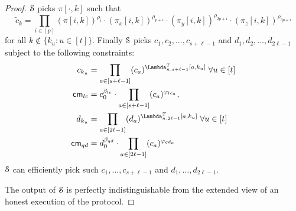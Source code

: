 \begin{proof}
	$\mathcal{S}$ picks $\pi[\cdot,k]$ such that 
	\[\tilde{c}_k = \prod_{i\in[p]}(\pi[i,k])^{\rho_i}\cdot (\pi_x[i,k])^{\rho_{p+i}}\cdot(\pi_y[i,k])^{\rho_{2p+i}}\cdot(\pi_z[i,k])^{\rho_{3p+i}}\] for all $k\notin\{k_u:u\in[t]\}$.
	Finally $\mathcal{S}$ picks $c_1,c_2,\ldots, c_{s+\ell-1}$ and $d_1, d_2, \ldots, d_{2\ell-1}$ subject to the following constraints:
	\begin{align*}
	c_{k_u} &= \prod_{a\in[s+\ell-1]} (c_a)^{\Lambda_{n,s+\ell-1}^T[a,k_u]} \; \forall u\in[t]\\  
	\cm_{lc} &= c_0^{\beta_{lc}}\cdot\prod_{a\in[s+\ell-1]}(c_a)^{\varphi_{lc_a}}, \\
	d_{k_u} &= \prod_{a\in[2\ell-1]} (d_a)^{\Lambda_{n,2\ell-1}^T[a,k_u]} \; \forall u\in[t]\\
	\cm_{qd} &= d_0^{\beta_{qd}}\cdot\prod_{a\in[2\ell-1]}(c_a)^{\varphi_{qd_a}}
	\end{align*}
	$\mathcal{S}$ can efficiently pick such $c_1, \ldots, c_{s+\ell-1}$ and $d_1, \ldots, d_{2\ell-1}$. 
	
	The output of $\mathcal{S}$ is perfectly indistinguishable from the extended view of an honest execution of the protocol.
\end{proof}
